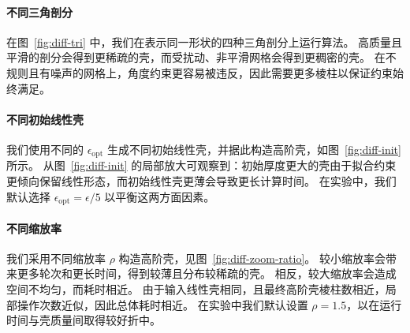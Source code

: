 \paragraph{不同三角剖分}
在图~\ref{fig:diff-tri} 中，我们在表示同一形状的四种三角剖分上运行算法。
高质量且平滑的剖分会得到更稀疏的壳，而受扰动、非平滑网格会得到更稠密的壳。
%
在不规则且有噪声的网格上，角度约束更容易被违反，因此需要更多棱柱以保证约束始终满足。




\paragraph{不同初始线性壳}
我们使用不同的 $\epsilon_\text{opt}$ 生成不同初始线性壳，并据此构造高阶壳，如图~\ref{fig:diff-init} 所示。
从图~\ref{fig:diff-init} 的局部放大可观察到：初始厚度更大的壳由于拟合约束更倾向保留线性形态，而初始线性壳更薄会导致更长计算时间。 %
在实验中，我们默认选择 $\epsilon_\text{opt} = \epsilon/5$ 以平衡这两方面因素。


\paragraph{不同缩放率}
我们采用不同缩放率 $\rho$ 构造高阶壳，见图~\ref{fig:diff-zoom-ratio}。
%
较小缩放率会带来更多轮次和更长时间，得到较薄且分布较稀疏的壳。
相反，较大缩放率会造成空间不均匀，而耗时相近。
由于输入线性壳相同，且最终高阶壳棱柱数相近，局部操作次数近似，因此总体耗时相近。
%
在实验中我们默认设置 $\rho = 1.5$，以在运行时间与壳质量间取得较好折中。


